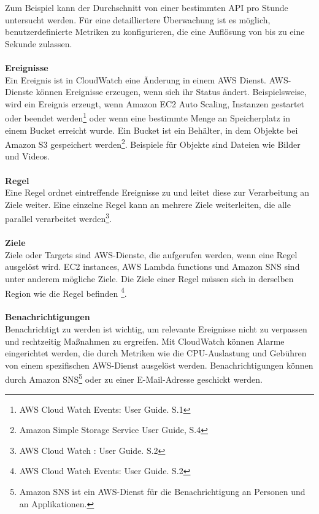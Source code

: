 Zum Beispiel kann der Durchschnitt von einer bestimmten API pro Stunde untersucht werden. Für eine detailliertere Überwachung ist es möglich, benutzerdefinierte Metriken zu konfigurieren, die eine Auflösung von bis zu eine Sekunde zulassen. %
\\\\
\textbf{Ereignisse}\\
Ein Ereignis ist in CloudWatch eine Änderung in einem AWS Dienst. AWS-Dienste können Ereignisse erzeugen, wenn sich ihr Status ändert. %
Beispielsweise, wird ein Ereignis erzeugt, wenn Amazon EC2 Auto Scaling, Instanzen gestartet oder beendet werden\footnote{AWS Cloud Watch Events: User Guide. S.1\cite{AMZ13}} oder wenn eine bestimmte Menge an Speicherplatz in einem Bucket erreicht wurde. Ein Bucket ist ein Behälter, in dem Objekte bei Amazon S3 gespeichert werden\footnote{Amazon Simple Storage Service User Guide, S.4\cite{AMZ18}}. Beispiele für Objekte sind Dateien wie Bilder und Videos. 
\\\\
\textbf{Regel} \\
Eine Regel ordnet eintreffende Ereignisse zu und leitet diese zur Verarbeitung an Ziele weiter.
Eine einzelne Regel kann an mehrere Ziele weiterleiten, die alle parallel verarbeitet werden\footnote{AWS Cloud Watch : User Guide. S.2\cite{AMZ13}}.
\\\\
\textbf{Ziele} \\
Ziele oder Targets sind AWS-Dienste, die aufgerufen werden, wenn eine Regel ausgelöst wird.
EC2 instances, AWS Lambda functions und Amazon SNS sind unter anderem mögliche Ziele.
Die Ziele einer Regel müssen sich in derselben Region wie die Regel befinden
\footnote{AWS Cloud Watch Events: User Guide. S.2\cite{AMZ13}}.
\\\\
\textbf{Benachrichtigungen}\\
Benachrichtigt zu werden ist wichtig, um relevante Ereignisse nicht zu verpassen und rechtzeitig Maßnahmen zu ergreifen. Mit CloudWatch können Alarme eingerichtet werden, die durch Metriken wie die CPU-Auslastung und Gebühren von einem spezifischen AWS-Dienst ausgelöst werden. Benachrichtigungen können durch Amazon SNS\footnote{Amazon SNS ist ein AWS-Dienst für die Benachrichtigung an Personen und an Applikationen.\cite{AMZ30}} oder zu einer E-Mail-Adresse geschickt werden.
